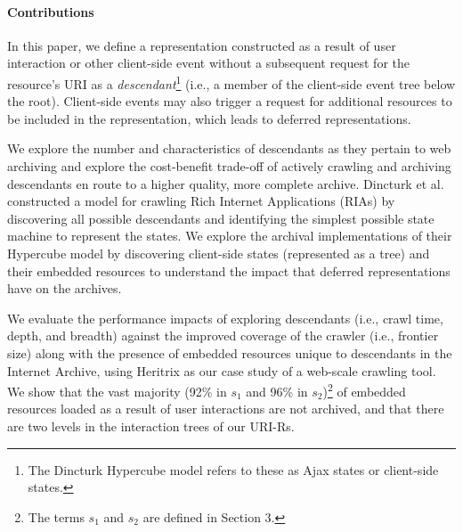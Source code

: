 \documentclass{sig-alternate}
\begin{document}
\paragraph{Contributions}
\label{contributions}

In this paper, we define a representation constructed as a result of user interaction or other client-side event without a subsequent request for the resource's URI as a \emph{descendant}\footnote{The Dincturk Hypercube model refers to these as Ajax states or client-side states.} (i.e., a member of the client-side event tree below the root). Client-side events may also trigger a request for additional resources to be included in the representation, which leads to deferred representations.

We explore the number and characteristics of descendants as they pertain to web archiving and explore the cost-benefit trade-off of actively crawling and archiving descendants en route to a higher quality, more complete archive. Dincturk et al. \cite{dincturkAjax} constructed a model for crawling Rich Internet Applications (RIAs) by discovering all possible descendants and identifying the simplest possible state machine to represent the states. We explore the archival implementations of their Hypercube model by discovering client-side states (represented as a tree) and their embedded resources to understand the impact that deferred representations have on the archives. %


We evaluate the performance impacts of exploring descendants (i.e., crawl time, depth, and breadth) against the improved coverage of the crawler (i.e., frontier size) along with the presence of embedded resources unique to descendants in the Internet Archive, using Heritrix as our case study of a web-scale crawling tool. We show that the vast majority (92\% in $s_1$ and 96\% in $s_2$)\footnote{The terms $s_1$ and $s_2$ are defined in Section 3.} of embedded resources loaded as a result of user interactions are not archived, and that there are two levels in the interaction trees of our URI-Rs.
\end{document}
